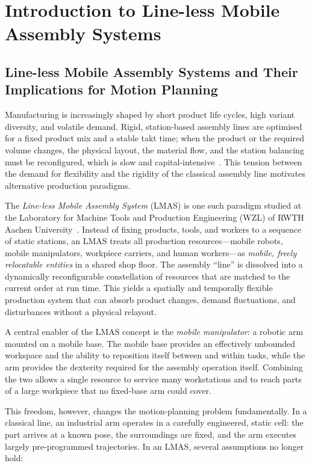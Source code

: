 \chapter{Introduction to Line-less Mobile Assembly Systems}
\label{ch:introduction}

\section{Line-less Mobile Assembly Systems and Their Implications for
  Motion Planning}
\label{sec:lmas}

Manufacturing is increasingly shaped by short product life cycles, high
variant diversity, and volatile demand. Rigid, station-based assembly
lines are optimised for a fixed product mix and a stable takt time; when
the product or the required volume changes, the physical layout, the
material flow, and the station balancing must be reconfigured, which is
slow and capital-intensive~\cite{Huettemann2016LMAS}. This tension
between the demand for flexibility and the rigidity of the classical
assembly line motivates alternative production paradigms.

The \emph{Line-less Mobile Assembly System} (LMAS) is one such paradigm
studied at the Laboratory for Machine Tools and Production Engineering
(WZL) of RWTH Aachen University~\cite{Kern2019LMAS,Buckhorst2022LMAS}.
Instead of fixing products, tools, and workers to a sequence of static
stations, an LMAS treats all production resources---mobile robots,
mobile manipulators, workpiece carriers, and human workers---as
\emph{mobile, freely relocatable entities} in a shared shop floor. The
assembly ``line'' is dissolved into a dynamically reconfigurable
constellation of resources that are matched to the current order at run
time. This yields a spatially and temporally flexible production system
that can absorb product changes, demand fluctuations, and disturbances
without a physical relayout.

A central enabler of the LMAS concept is the \emph{mobile manipulator}: a
robotic arm mounted on a mobile base. The mobile base provides an
effectively unbounded workspace and the ability to reposition itself
between and within tasks, while the arm provides the dexterity required
for the assembly operation itself. Combining the two allows a single
resource to service many workstations and to reach parts of a large
workpiece that no fixed-base arm could cover.

This freedom, however, changes the motion-planning problem
fundamentally. In a classical line, an industrial arm operates in a
carefully engineered, static cell: the part arrives at a known pose, the
surroundings are fixed, and the arm executes largely pre-programmed
trajectories. In an LMAS, several assumptions no longer hold:

